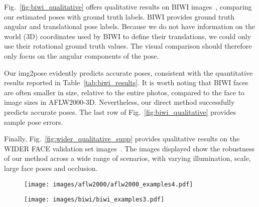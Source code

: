 \documentclass[final]{cvpr}
\begin{document}
Fig.~\ref{fig:biwi_qualitative} offers qualitative results on BIWI images~\cite{biwi}, comparing our estimated poses with ground truth labels. BIWI provides ground truth angular and translational pose labels. Because we do not have information on the world (3D) coordinates used by BIWI to define their translations, we could only use their rotational ground truth values. The visual comparison should therefore only focus on the angular components of the pose. 

Our img2pose evidently predicts accurate poses, consistent with the quantitative results reported in Table~\ref{tab:biwi_results}. It is worth noting that BIWI faces are often smaller in size, relative to the entire photos, compared to the face to image sizes in AFLW2000-3D. Nevertheless, our direct method successfully predicts accurate poses. The last row of Fig.~\ref{fig:biwi_qualitative} provides sample pose errors. 

Finally, Fig.~\ref{fig:wider_qualitative_supp} provides qualitative results on the WIDER FACE validation set images~\cite{wider_face}. The images displayed show the robustness of our method across a wide range of scenarios, with varying illumination, scale, large face poses and occlusion.

\begin{figure*}[!ht]
    \centering
    \begin{subfigure}[b]{1\textwidth}
        \centering
        \texttt{[image: images/aflw2000/aflw2000\_examples4.pdf]}
    \end{subfigure}
    \caption{Qualitative comparing the results of our img2pose method on images from the AFLW2000-3D set to the ground truth poses. Poses visualized using a 3D face shape rendered using the pose on input photos. We provide results reflecting a wide range of face poses and viewing settings. The bottom row provides sample qualitative errors.}
    \label{fig:aflw2000_qualitative}
\end{figure*}

\begin{figure*}[!ht]
    \centering
    \begin{subfigure}[b]{1\textwidth}
        \centering
        \texttt{[image: images/biwi/biwi\_examples3.pdf]}
    \end{subfigure}
    \caption{Qualitative pose estimation results on BIWI images, comparing the poses estimated by our img2pose with the ground truth. These results demonstrate how well our method correctly estimates poses for even small faces. The bottom row provides samples of the limitations of our model. Note that in all these images, the translation component of the pose, , was estimated by our img2pose both for our results and the ground truth, as ground truth labels do not provide this information.}
    \label{fig:biwi_qualitative}
\end{figure*}
\end{document}
